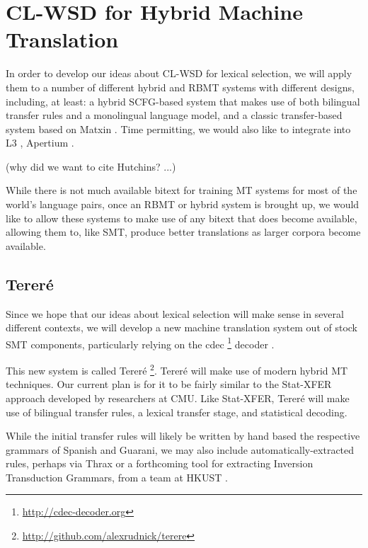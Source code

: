 \section{CL-WSD for Hybrid Machine Translation}
In order to develop our ideas about CL-WSD for lexical selection, we will apply
them to a number of different hybrid and RBMT systems with different designs,
including, at least: a hybrid SCFG-based system that makes use of both
bilingual transfer rules and a monolingual language model, and a classic
transfer-based system based on Matxin \cite{matxin_2005}. Time permitting, we
would also like to integrate into L3 \cite{gasser:sxdg}, Apertium
\cite{Forcada_theapertium}.

(why did we want to cite Hutchins? ...)
\cite{hutchins1992introduction}

While there is not much available bitext for training MT systems for most of
the world's language pairs, once an RBMT or hybrid system is brought up, we
would like to allow these systems to make use of any bitext that does become
available, allowing them to, like SMT, produce better translations as larger
corpora become available.

\subsection{Tereré}
Since we hope that our ideas about lexical selection will make sense in several
different contexts, we will develop a new machine translation system out of
stock SMT components, particularly relying on the cdec
\footnote{\url{http://cdec-decoder.org}} decoder \cite{Dyer_etal_2010}.

This new system is called
Tereré \footnote{\url{http://github.com/alexrudnick/terere}}. Tereré will make
use of modern hybrid MT techniques. Our current plan is for it to be fairly
similar to the Stat-XFER approach \cite{DBLP:conf/cicling/Lavie08} developed by
researchers at CMU.
Like Stat-XFER, Tereré will make use of bilingual transfer rules, a lexical
transfer stage, and statistical decoding.

While the initial transfer rules will likely be written by hand based the
respective grammars of Spanish and Guarani, we may also include
automatically-extracted rules, perhaps via Thrax \cite{weese-EtAl:2011:WMT} or
a forthcoming tool for extracting Inversion Transduction Grammars, from a team
at HKUST \cite{saers-addanki-wu:2013:HyTra}.

